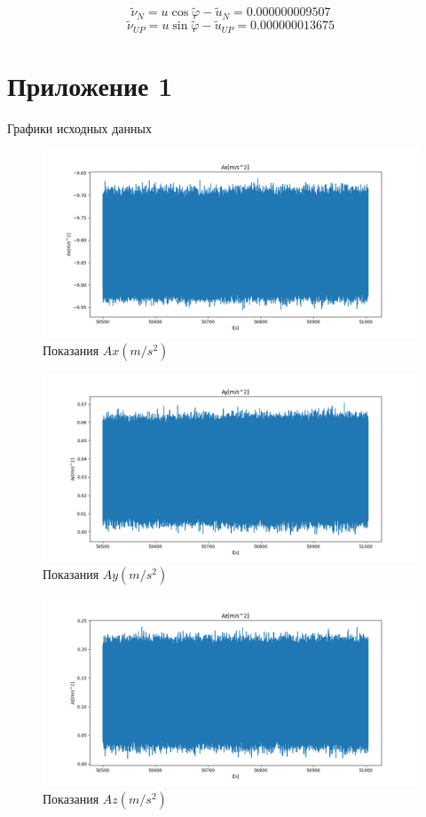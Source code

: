 \documentclass[a4paper,14pt]{article}
\theoremstyle{plain} %
\theoremstyle{definition} %
\theoremstyle{remark} %
\begin{document}
{$$
    \widetilde{\nu}_{N}=u \cos \widetilde{\varphi}-\widetilde{u}_{N}=0.000000009507
$$
$$
    \widetilde{\nu}_{U P}=u \sin \widetilde{\varphi}-\widetilde{u}_{U P}=0.000000013675
$$

\section{Приложение 1}
Графики исходных данных

\begin{figure}[h!]
    \centering
    \includegraphics[width=0.99\linewidth]{Ax.png}
    \caption{Показания $Ax(m/s^2)$}
    \label{fig:ax}
\end{figure}

\begin{figure}[h!]
    \centering
    \includegraphics[width=0.99\linewidth]{Ay.png}
    \caption{Показания $Ay(m/s^2)$}
    \label{fig:ay}
\end{figure}

\begin{figure}[h!]
    \centering
    \includegraphics[width=0.99\linewidth]{Az.png}
    \caption{Показания $Az(m/s^2)$}
    \label{fig:az}
\end{figure}

}
\end{document}
